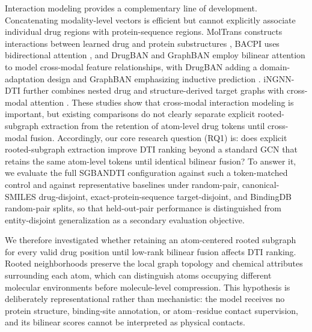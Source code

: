 \documentclass[computers,article,submit,moreauthors]{Definitions/mdpi}
\begin{document}
Interaction modeling provides a complementary line of development. Concatenating modality-level vectors is efficient but cannot explicitly associate individual drug regions with protein-sequence regions. MolTrans constructs interactions between learned drug and protein substructures \citep{huang2021moltrans}, BACPI uses bidirectional attention \citep{li2022bacpi}, and DrugBAN and GraphBAN employ bilinear attention to model cross-modal feature relationships, with DrugBAN adding a domain-adaptation design and GraphBAN emphasizing inductive prediction \citep{bai2023drugban,hadipour2025graphban}. iNGNN-DTI further combines nested drug and structure-derived target graphs with cross-modal attention \citep{sun2024ingnndti}. These studies show that cross-modal interaction modeling is important, but existing comparisons do not clearly separate explicit rooted-subgraph extraction from the retention of atom-level drug tokens until cross-modal fusion. Accordingly, our core research question (RQ1) is: does explicit rooted-subgraph extraction improve DTI ranking beyond a standard GCN that retains the same atom-level tokens until identical bilinear fusion? To answer it, we evaluate the full SGBANDTI configuration against such a token-matched control and against representative baselines under random-pair, canonical-SMILES drug-disjoint, exact-protein-sequence target-disjoint, and BindingDB random-pair splits, so that held-out-pair performance is distinguished from entity-disjoint generalization as a secondary evaluation objective.

We therefore investigated whether retaining an atom-centered rooted subgraph for every valid drug position until low-rank bilinear fusion affects DTI ranking. Rooted neighborhoods preserve the local graph topology and chemical attributes surrounding each atom, which can distinguish atoms occupying different molecular environments before molecule-level compression. This hypothesis is deliberately representational rather than mechanistic: the model receives no protein structure, binding-site annotation, or atom--residue contact supervision, and its bilinear scores cannot be interpreted as physical contacts.
\end{document}
